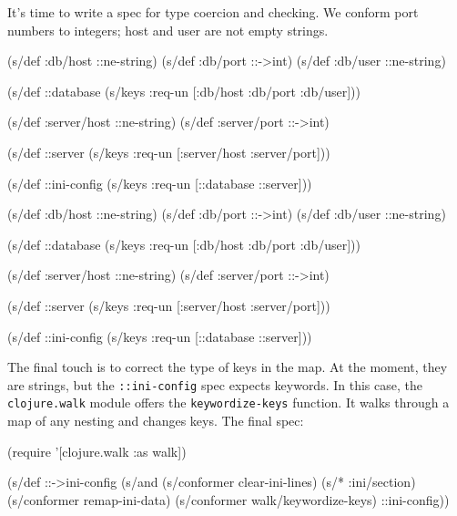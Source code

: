 \fi

It's time to write a spec for type coercion and checking. We conform port numbers to integers; host and user are not empty strings.

\ifx\DEVICETYPE\MOBILE

\begin{english}
  \begin{clojure}
(s/def :db/host ::ne-string)
(s/def :db/port ::->int)
(s/def :db/user ::ne-string)

(s/def ::database
  (s/keys :req-un
    [:db/host :db/port :db/user]))

(s/def :server/host ::ne-string)
(s/def :server/port ::->int)

(s/def ::server
  (s/keys :req-un
    [:server/host :server/port]))

(s/def ::ini-config
  (s/keys :req-un [::database ::server]))
  \end{clojure}
\end{english}

\else

\begin{english}
  \begin{clojure}
(s/def :db/host ::ne-string)
(s/def :db/port ::->int)
(s/def :db/user ::ne-string)

(s/def ::database
  (s/keys :req-un [:db/host :db/port :db/user]))

(s/def :server/host ::ne-string)
(s/def :server/port ::->int)

(s/def ::server
  (s/keys :req-un [:server/host :server/port]))

(s/def ::ini-config
  (s/keys :req-un [::database ::server]))
  \end{clojure}
\end{english}

\fi


The final touch is to correct the type of keys in the map. At the moment, they are strings, but the \verb|::ini-config| spec expects keywords. In this case, the \verb|clojure.walk| module offers the \verb|keywordize-keys| function. It walks through a map of any nesting and changes keys. The final spec:

\begin{english}
  \begin{clojure}
(require '[clojure.walk :as walk])

(s/def ::->ini-config
  (s/and
   (s/conformer clear-ini-lines)
   (s/* :ini/section)
   (s/conformer remap-ini-data)
   (s/conformer walk/keywordize-keys)
   ::ini-config))
  \end{clojure}
\end{english}

